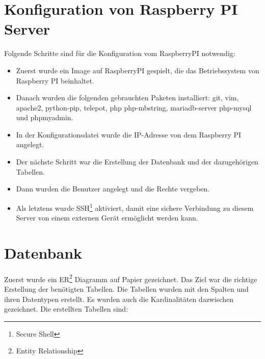 \section{Konfiguration von Raspberry PI Server}
Folgende Schritte sind für die Konfiguration vom RaspberryPI notwendig: \\
\begin{itemize}
	\item Zuerst wurde ein Image auf RaspberryPI gespielt, die das Betriebssystem von Raspberry PI beinhaltet.
\end{itemize}
\begin{itemize}
	\item Danach wurden die folgenden gebrauchten Paketen installiert: git, vim, apache2, python-pip, telepot, php php-mbstring, mariadb-server php-mysql und phpmyadmin.
\end{itemize}
\begin{itemize}
	\item In der Konfigurationsdatei wurde die IP-Adresse von dem Raspberry PI angelegt.
\end{itemize}
\begin{itemize}
	\item Der nächste Schritt war die Erstellung der Datenbank und der dazugehörigen Tabellen.
\end{itemize}
\begin{itemize}
	\item Dann wurden die Benutzer angelegt und die Rechte vergeben.
\end{itemize}
\begin{itemize}
	\item Als letztens wurde SSH\footnote{Secure Shell} aktiviert, damit eine sichere Verbindung zu diesem Server von einem externen Gerät ermöglicht werden kann.
\end{itemize}
\section{Datenbank}
Zuerst wurde ein ER\footnote{Entity Relationship} Diagramm auf Papier gezeichnet. Das Ziel war die richtige Erstellung der benötigten Tabellen. Die Tabellen wurden mit den Spalten und ihren Datentypen erstellt. Es wurden auch die Kardinalitäten dazwischen gezeichnet. Die erstellten Tabellen sind:
	
